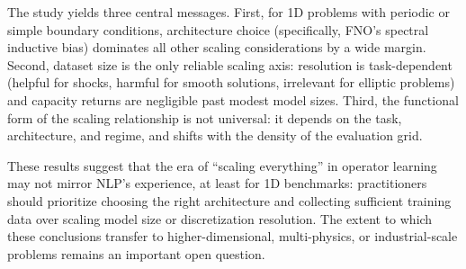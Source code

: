 \documentclass[11pt]{article}
\begin{document}
The study yields three central messages.
First, for 1D problems with periodic or simple boundary conditions,
architecture choice (specifically, FNO's spectral inductive bias)
dominates all other scaling considerations by a wide margin.
Second, dataset size is the only reliable scaling axis:
resolution is task-dependent (helpful for shocks, harmful for smooth
solutions, irrelevant for elliptic problems) and capacity returns
are negligible past modest model sizes.
Third, the functional form of the scaling relationship is not
universal: it depends on the task, architecture, and regime, and
shifts with the density of the evaluation grid.

These results suggest that the era of ``scaling everything'' in
operator learning may not mirror NLP's experience, at least for
1D benchmarks: practitioners should prioritize choosing the right
architecture and collecting sufficient training data over scaling
model size or discretization resolution.
The extent to which these conclusions transfer to higher-dimensional,
multi-physics, or industrial-scale problems remains an important
open question.
\end{document}
